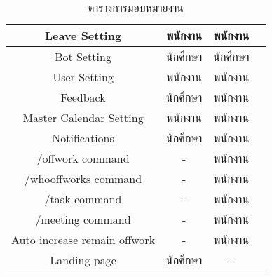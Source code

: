 \begin{table}[!htbp]
\begin{tabular}{cccl}
		\multicolumn{1}{|c|}{Leave Setting}           & \multicolumn{1}{c|}{พนักงาน}                     & \multicolumn{1}{c|}{พนักงาน}                    \\ \hline
		\multicolumn{1}{|c|}{Bot Setting}                  & \multicolumn{1}{c|}{นักศึกษา}                     & \multicolumn{1}{c|}{นักศึกษา}                    \\ \hline
		\multicolumn{1}{|c|}{User Setting}                 & \multicolumn{1}{c|}{พนักงาน}                     & \multicolumn{1}{c|}{พนักงาน}                    \\ \hline
		\multicolumn{1}{|c|}{Feedback}                     & \multicolumn{1}{c|}{นักศึกษา}                     & \multicolumn{1}{c|}{พนักงาน}                    \\ \hline
		\multicolumn{1}{|c|}{Master Calendar Setting}      & \multicolumn{1}{c|}{พนักงาน}                     & \multicolumn{1}{c|}{พนักงาน}                    \\ \hline
		\multicolumn{1}{|c|}{Notifications}                & \multicolumn{1}{c|}{นักศึกษา}                     & \multicolumn{1}{c|}{พนักงาน}                    \\ \hline
		\multicolumn{1}{|c|}{/offwork command}             & \multicolumn{1}{c|}{-}                          & \multicolumn{1}{c|}{พนักงาน}                    \\ \hline
		\multicolumn{1}{|c|}{/whooffworks command}         & \multicolumn{1}{c|}{-}                          & \multicolumn{1}{c|}{พนักงาน}                    \\ \hline
		\multicolumn{1}{|c|}{/task command}                & \multicolumn{1}{c|}{-}                          & \multicolumn{1}{c|}{พนักงาน}                    \\ \hline
		\multicolumn{1}{|c|}{/meeting command}             & \multicolumn{1}{c|}{-}                          & \multicolumn{1}{c|}{พนักงาน}                    \\ \hline
		\multicolumn{1}{|c|}{Auto increase remain offwork} & \multicolumn{1}{c|}{-}                          & \multicolumn{1}{c|}{พนักงาน}                    \\ \hline
		\multicolumn{1}{|c|}{Landing page}                 & \multicolumn{1}{c|}{นักศึกษา}                     & \multicolumn{1}{c|}{-}                         \\ \hline
	\end{tabular}
	\caption{ตารางการมอบหมายงาน}
\end{table}

